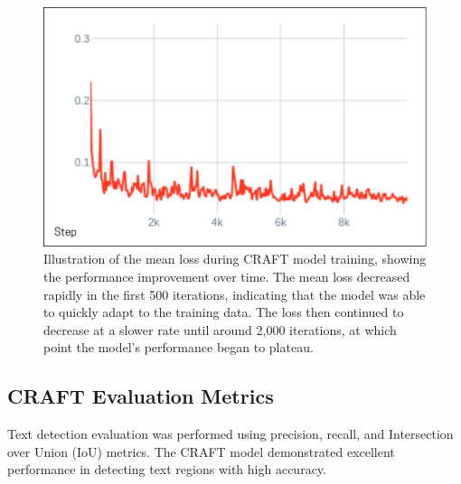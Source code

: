 \begin{figure}[H]
    \centering
    \includegraphics[width=\textwidth]{figures/mean_loss_craft.png}
    \caption{Illustration of the mean loss during CRAFT model training, showing the performance 
    improvement over time. The mean loss decreased rapidly in the first 500 iterations, 
    indicating that the model was able to quickly adapt to the training data. The loss then 
    continued to decrease at a slower rate until around 2,000 iterations, at which point 
    the model's performance began to plateau.}
    \label{fig:mean-loss-craft}
\end{figure}

\subsection{CRAFT Evaluation Metrics}
\label{subsec:craft-evaluation}

Text detection evaluation was performed using precision, recall, and Intersection over Union (IoU) metrics. The CRAFT model demonstrated excellent performance in detecting text regions with high accuracy.


